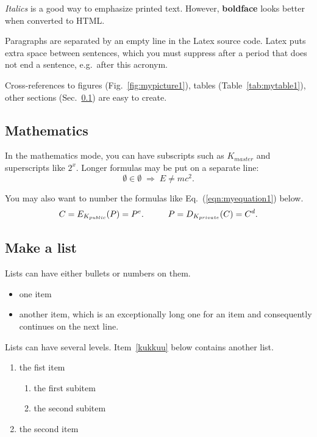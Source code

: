 \documentclass[article]{aaltoseries}
\begin{document}
\textit{Italics} is a good way to emphasize printed text. However,
\textbf{boldface} looks better when converted to HTML.

Paragraphs are separated by an empty line in the Latex source code.
Latex puts extra space between sentences, which you must suppress
after a period that does not end a sentence, e.g.\ after this acronym.

Cross-references to figures (Fig.~\ref{fig:mypicture1}), tables
(Table~\ref{tab:mytable1}), other sections (Sec.~\ref{sec:math})
are easy to create. 




\subsection{Mathematics}
\label{sec:math}

In the mathematics mode, you can have subscripts such as $K_{master}$
and superscripts like $2^x$. Longer formulas may be put on a separate
line:
\[ \emptyset \in \emptyset \; \Rightarrow \; E \neq mc^2. \]

You may also want to number the formulas like Eq.~(\ref{eqn:myequation1})
below.
\begin{equation}\label{eqn:myequation1}
C = E_{K_{public}}(P) = P^e. \hspace{10mm}   P = D_{K_{private}}(C) = C^d.
\end{equation}





\subsection{Make a list}
\label{sec:list}

Lists can have either bullets or numbers on them. 

\begin{itemize}
\item one item
\item another item, which is an exceptionally long one for an item
  and consequently continues on the next line.
\end{itemize}

Lists can have several levels. Item~\ref{kukkuu} below contains
another list.
\begin{enumerate}
\item the fist item \label{kukkuu}
  \begin{enumerate}
  \item the first subitem 
  \item the second subitem
  \end{enumerate}
\item the second item
\end{enumerate}
\end{document}
